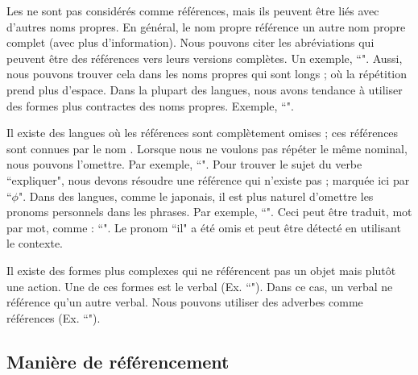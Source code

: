 \documentclass{KodeBook}
\begin{document}
Les  ne sont pas considérés comme références, mais ils peuvent être liés avec d'autres noms propres. 
En général, le nom propre référence un autre nom propre complet (avec plus d'information). 
Nous pouvons citer les abréviations qui peuvent être des références vers leurs versions complètes.
Un exemple, ``".
Aussi, nous pouvons trouver cela dans les noms propres qui sont longs ; où la répétition prend plus d'espace. 
Dans la plupart des langues, nous avons tendance à utiliser des formes plus contractes des noms propres. 
Exemple, ``".

Il existe des langues où les références sont complètement omises ; ces références sont connues par le nom . 
Lorsque nous ne voulons pas répéter le même  nominal, nous pouvons l'omettre. 
Par exemple, ``".
Pour trouver le sujet du verbe ``expliquer", nous devons résoudre une référence qui n'existe pas ; marquée ici par ``$ \phi $".
Dans des langues, comme le japonais, il est plus naturel d'omettre les pronoms personnels dans les phrases. 
Par exemple, ``". 
Ceci peut être traduit, mot par mot, comme : ``".
Le pronom ``il" a été omis et peut être détecté en utilisant le contexte.

Il existe des formes plus complexes qui ne référencent pas un objet mais plutôt une action.
Une de ces formes est le  verbal (Ex. ``").
Dans ce cas, un  verbal ne référence qu'un autre  verbal. 
Nous pouvons utiliser des adverbes comme références (Ex. ``").


\subsection{Manière de référencement}
\end{document}
